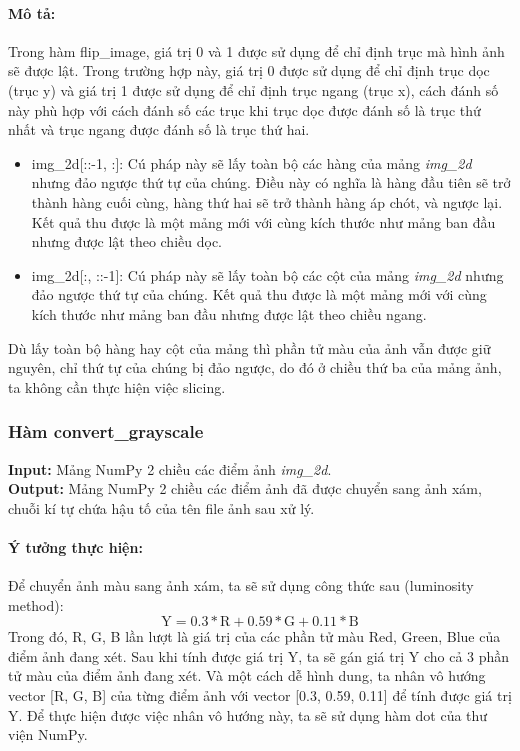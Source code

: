 \documentclass[]{article}
\begin{document}
\paragraph{Mô tả:} Trong hàm flip\_image, giá trị 0 và 1 được sử dụng để chỉ định trục mà hình ảnh sẽ được lật. Trong trường hợp này, giá trị 0 được sử dụng để chỉ định trục dọc (trục y) và giá trị 1 được sử dụng để chỉ định trục ngang (trục x), cách đánh số này phù hợp với cách đánh số các trục khi trục dọc được đánh số là trục thứ nhất và trục ngang được đánh số là trục thứ hai.
\begin{itemize}
  \item img\_2d[::-1, :]:
  Cú pháp này sẽ lấy toàn bộ các hàng của mảng \textit{img\_2d} nhưng đảo ngược thứ tự của chúng. Điều này có nghĩa là hàng đầu tiên sẽ trở thành hàng cuối cùng, hàng thứ hai sẽ trở thành hàng áp chót, và ngược lại. Kết quả thu được là một mảng mới với cùng kích thước như mảng ban đầu nhưng được lật theo chiều dọc.
  \item img\_2d[:, ::-1]:
  Cú pháp này sẽ lấy toàn bộ các cột của mảng \textit{img\_2d} nhưng đảo ngược thứ tự của chúng. Kết quả thu được là một mảng mới với cùng kích thước như mảng ban đầu nhưng được lật theo chiều ngang.
\end{itemize}
Dù lấy toàn bộ hàng hay cột của mảng thì phần tử màu của ảnh vẫn được giữ nguyên, chỉ thứ tự của chúng bị đảo ngược, do đó ở chiều thứ ba của mảng ảnh, ta không cần thực hiện việc slicing.

\subsubsection{Hàm convert\_grayscale}
\textbf{Input:} Mảng NumPy 2 chiều các điểm ảnh \textit{img\_2d}. \\
\textbf{Output:} Mảng NumPy 2 chiều các điểm ảnh đã được chuyển sang ảnh xám, chuỗi kí tự chứa hậu tố của tên file ảnh sau xử lý.

\paragraph{Ý tưởng thực hiện:} Để chuyển ảnh màu sang ảnh xám, ta sẽ sử dụng công thức sau (luminosity method):
\[ \text{Y} = 0.3*\text{R} + 0.59*\text{G} + 0.11*\text{B}\]
Trong đó, R, G, B lần lượt là giá trị của các phần tử màu Red, Green, Blue của điểm ảnh đang xét. Sau khi tính được giá trị Y, ta sẽ gán giá trị Y cho cả 3 phần tử màu của điểm ảnh đang xét. Và một cách dễ hình dung, ta nhân vô hướng vector [R, G, B] của từng điểm ảnh với vector [0.3, 0.59, 0.11] để tính được giá trị Y. Để thực hiện được việc nhân vô hướng này, ta sẽ sử dụng hàm dot của thư viện NumPy.
\end{document}

